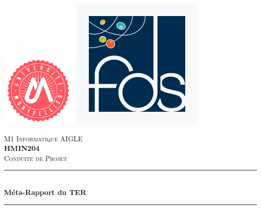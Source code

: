 \documentclass[12pt,a4paper]{report}
\begin{document}
\begin{titlepage}
\newcommand{\HRule}{\rule{\linewidth}{0.5mm}} %
\center

\includegraphics[scale=0.5]{images/umLogo.png} %
\hspace{\fill}
\includegraphics[scale=0.25]{images/fdsLogo.jpg} %

\textsc{\LARGE M1 Informatique AIGLE}\\[1cm]
\textsc{\Large \textbf{HMIN204}}\\[0.25cm]
\textsc{\large Conduite de Projet}\\[0.5cm]

\HRule \\[0.4cm]
{ \huge \bfseries Méta-Rapport du TER}\\[0.4cm]
\HRule \\[0.5cm]


\end{titlepage}
\end{document}
